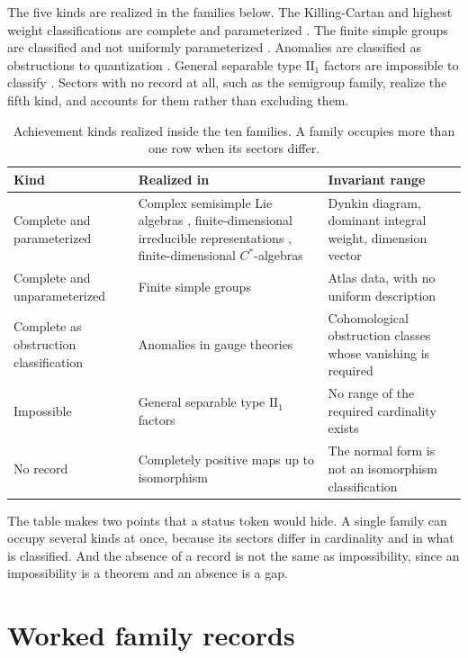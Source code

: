 \documentclass[11pt,letterpaper]{article}
\theoremstyle{definition}
\theoremstyle{remark}
\begin{document}
The five kinds are realized in the families below. The Killing-Cartan and highest weight classifications are complete and parameterized \cite{lie,hw}. The finite simple groups are classified and not uniformly parameterized \cite{cfsg,solomon}. Anomalies are classified as obstructions to quantization \cite{anomaly}. General separable type $\mathrm{II}_1$ factors are impossible to classify \cite{vnalg}. Sectors with no record at all, such as the semigroup family, realize the fifth kind, and  accounts for them rather than excluding them.

\begin{table}[ht]
\centering
\small
\caption{Achievement kinds realized inside the ten families. A family occupies more than one row when its sectors differ.}
\label{tab:kinds}
\begin{tabularx}{\textwidth}{L{0.27\textwidth} L{0.26\textwidth} X}
\toprule
Kind & Realized in & Invariant range \\
\midrule
Complete and parameterized & Complex semisimple Lie algebras \cite{lie}, finite-dimensional irreducible representations \cite{hw}, finite-dimensional $C^*$-algebras \cite{calg} & Dynkin diagram, dominant integral weight, dimension vector \\
Complete and unparameterized & Finite simple groups \cite{cfsg,solomon} & Atlas data, with no uniform description \\
Complete as obstruction classification & Anomalies in gauge theories \cite{anomaly} & Cohomological obstruction classes whose vanishing is required \\
Impossible & General separable type $\mathrm{II}_1$ factors \cite{vnalg} & No range of the required cardinality exists \\
No record & Completely positive maps up to isomorphism \cite{stinespring,qchannel} & The normal form is not an isomorphism classification \\
\bottomrule
\end{tabularx}
\end{table}

The table makes two points that a status token would hide. A single family can occupy several kinds at once, because its sectors differ in cardinality and in what is classified. And the absence of a record is not the same as impossibility, since an impossibility is a theorem and an absence is a gap.

\section{Worked family records}
\label{sec:worked}
\end{document}

